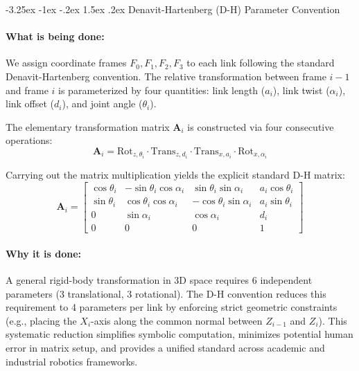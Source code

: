 \documentclass[11pt, a4paper]{article}
\makeatletter
\renewcommand{\subsection}{\@startsection{subsection}{2}{\z@}%
    {-3.25ex \@plus -1ex \@minus -.2ex}%
    {1.5ex \@plus .2ex}%
    {\normalfont\large\bfseries\color{brandaccent}}}
\makeatother
\begin{document}
\subsection{Denavit-Hartenberg (D-H) Parameter Convention}
\paragraph{What is being done:}
We assign coordinate frames $F_0, F_1, F_2, F_3$ to each link following the standard Denavit-Hartenberg convention. The relative transformation between frame $i-1$ and frame $i$ is parameterized by four quantities: link length ($a_i$), link twist ($\alpha_i$), link offset ($d_i$), and joint angle ($\theta_i$).

The elementary transformation matrix $\mathbf{A}_i$ is constructed via four consecutive operations:
\begin{equation}
    \mathbf{A}_i = \text{Rot}_{z, \theta_i} \cdot \text{Trans}_{z, d_i} \cdot \text{Trans}_{x, a_i} \cdot \text{Rot}_{x, \alpha_i}
\end{equation}

Carrying out the matrix multiplication yields the explicit standard D-H matrix:
\begin{equation}
    \mathbf{A}_i = \begin{bmatrix} 
    \cos\theta_i & -\sin\theta_i \cos\alpha_i & \sin\theta_i \sin\alpha_i & a_i \cos\theta_i \\ 
    \sin\theta_i & \cos\theta_i \cos\alpha_i & -\cos\theta_i \sin\alpha_i & a_i \sin\theta_i \\ 
    0 & \sin\alpha_i & \cos\alpha_i & d_i \\ 
    0 & 0 & 0 & 1 
    \end{bmatrix}
\end{equation}

\paragraph{Why it is done:}
A general rigid-body transformation in 3D space requires 6 independent parameters (3 translational, 3 rotational). The D-H convention reduces this requirement to 4 parameters per link by enforcing strict geometric constraints (e.g., placing the $X_i$-axis along the common normal between $Z_{i-1}$ and $Z_i$). This systematic reduction simplifies symbolic computation, minimizes potential human error in matrix setup, and provides a unified standard across academic and industrial robotics frameworks.
\end{document}
